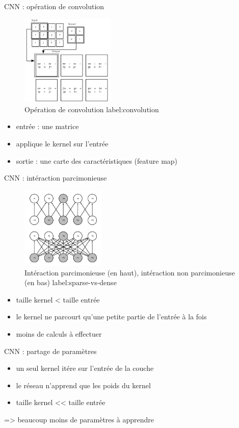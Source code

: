 \documentclass[presentation]{beamer}
\begin{document}
\begin{frame}[label={sec:org3e5b15f}]{CNN : opération de convolution}
\begin{figure}[htbp]
\centering
\includegraphics[width=4.5cm]{convolution.png}
\caption{Opération de convolution label:convolution}
\end{figure}
\begin{itemize}
\item entrée : une matrice
\item applique le kernel sur l'entrée
\item sortie : une carte des caractéristiques (feature map)
\end{itemize}
\end{frame}

\begin{frame}[label={sec:orgd665bae}]{CNN : intéraction parcimonieuse}
\begin{figure}[htbp]
\centering
\includegraphics[width=4cm]{sparse_vs_dense.png}
\caption{Intéraction parcimonieuse (en haut), intéraction non parcimonieuse (en bas) label:sparse-vs-dense}
\end{figure}
\begin{itemize}
\item taille kernel < taille entrée
\item le kernel ne parcourt qu'une petite partie de l'entrée à la fois
\item moins de calculs à effectuer
\end{itemize}
\end{frame}

\begin{frame}[label={sec:org83ff5b2}]{CNN : partage de paramètres}
\begin{itemize}
\item un seul kernel itére sur l'entrée de la couche
\item le réseau n'apprend que les poids du kernel
\item taille kernel << taille entrée
\end{itemize}

=> beaucoup moins de paramètres à apprendre
\end{frame}
\end{document}
